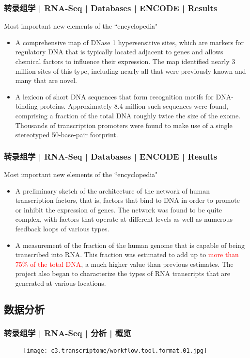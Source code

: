 \begin{frame}
  \frametitle{转录组学 | RNA-Seq | Databases | ENCODE | Results}
  \begin{block}{Most important new elements of the ``encyclopedia"}
    \begin{itemize}
      \item A comprehensive map of DNase 1 hypersensitive sites, which are markers for regulatory DNA that is typically located adjacent to genes and allows chemical factors to influence their expression. The map identified nearly 3 million sites of this type, including nearly all that were previously known and many that are novel.
      \item A lexicon of short DNA sequences that form recognition motifs for DNA-binding proteins. Approximately 8.4 million such sequences were found, comprising a fraction of the total DNA roughly twice the size of the exome. Thousands of transcription promoters were found to make use of a single stereotyped 50-base-pair footprint.
    \end{itemize}
  \end{block}
\end{frame}

\begin{frame}
  \frametitle{转录组学 | RNA-Seq | Databases | ENCODE | Results}
  \begin{block}{Most important new elements of the ``encyclopedia"}
    \begin{itemize}
      \item A preliminary sketch of the architecture of the network of human transcription factors, that is, factors that bind to DNA in order to promote or inhibit the expression of genes. The network was found to be quite complex, with factors that operate at different levels as well as numerous feedback loops of various types.
      \item A measurement of the fraction of the human genome that is capable of being transcribed into RNA. This fraction was estimated to add up to \textcolor{red}{more than 75\% of the total DNA}, a much higher value than previous estimates. The project also began to characterize the types of RNA transcripts that are generated at various locations.
    \end{itemize}
  \end{block}
\end{frame}

\subsection{数据分析}
\begin{frame}
  \frametitle{转录组学 | RNA-Seq | 分析 | 概览}
  \begin{figure}
    \centering
    \texttt{[image: c3.transcriptome/workflow.tool.format.01.jpg]}
  \end{figure}
\end{frame}

